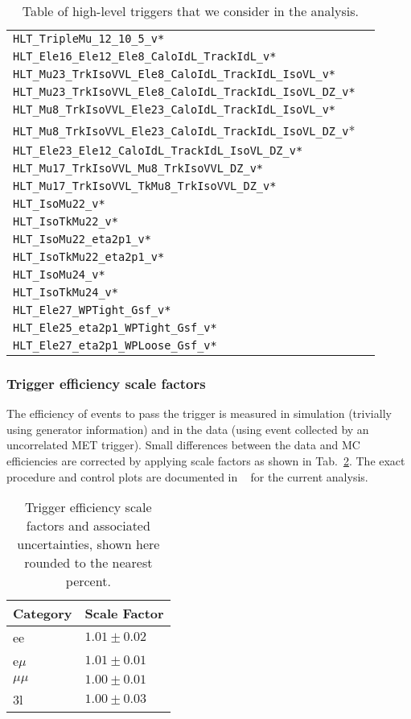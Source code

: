 \begin{table}
\begin{tabular}{ll}
\verb|HLT_TripleMu_12_10_5_v*|\\
\verb|HLT_Ele16_Ele12_Ele8_CaloIdL_TrackIdL_v*|\\
\verb|HLT_Mu23_TrkIsoVVL_Ele8_CaloIdL_TrackIdL_IsoVL_v*|\\
\verb|HLT_Mu23_TrkIsoVVL_Ele8_CaloIdL_TrackIdL_IsoVL_DZ_v*| \\
\verb|HLT_Mu8_TrkIsoVVL_Ele23_CaloIdL_TrackIdL_IsoVL_v*|\\
\verb|HLT_Mu8_TrkIsoVVL_Ele23_CaloIdL_TrackIdL_IsoVL_DZ_v|* \\
\verb|HLT_Ele23_Ele12_CaloIdL_TrackIdL_IsoVL_DZ_v*|\\
\verb|HLT_Mu17_TrkIsoVVL_Mu8_TrkIsoVVL_DZ_v*|\\
\verb|HLT_Mu17_TrkIsoVVL_TkMu8_TrkIsoVVL_DZ_v*|\\
\verb|HLT_IsoMu22_v*|\\
\verb|HLT_IsoTkMu22_v*|\\
\verb|HLT_IsoMu22_eta2p1_v*|\\
\verb|HLT_IsoTkMu22_eta2p1_v*|\\
\verb|HLT_IsoMu24_v*|\\
\verb|HLT_IsoTkMu24_v*|\\
\verb|HLT_Ele27_WPTight_Gsf_v*|\\
\verb|HLT_Ele25_eta2p1_WPTight_Gsf_v*|\\
\verb|HLT_Ele27_eta2p1_WPLoose_Gsf_v*|\\
\hline
\end{tabular}
\caption{Table of high-level triggers that we consider in the analysis.} \label{tab:triggers}
\end{table}

\subsubsection{Trigger efficiency scale factors}
The efficiency of events to pass the trigger is measured in simulation (trivially using generator information) and in the data (using event collected by an uncorrelated MET trigger). Small differences between the data and MC efficiencies are corrected by applying scale factors as shown in Tab.~\ref{tab:trigSFs}. The exact procedure and control plots are documented in ~\cite{CMS_AN_2017-029} for the current analysis.

\begin{table}
\centering
\begin{tabular}{ll}
Category & Scale Factor \\\hline
    ee   & $1.01 \pm 0.02$ \\
e$\mu$   & $1.01 \pm 0.01$ \\
$\mu\mu$ & $1.00 \pm 0.01$ \\
3l       & $1.00 \pm 0.03$ \\\hline
\end{tabular}
\caption[Trigger efficiency scale factors and associated uncertainties.]{Trigger efficiency scale factors and associated uncertainties, shown here rounded to the nearest percent.}
\label{tab:trigSFs}
\end{table}


